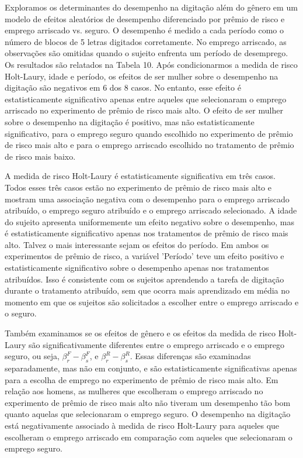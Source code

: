 \documentclass[a4paper,12pt]{article}[abntex2]
\begin{document}
Exploramos os determinantes do desempenho na digitação além do gênero em um modelo de efeitos aleatórios de desempenho diferenciado por prêmio de risco e emprego arriscado vs. seguro. O desempenho é medido a cada período como o número de blocos de 5 letras digitados corretamente. No emprego arriscado, as observações são omitidas quando o sujeito enfrenta um período de desemprego. Os resultados são relatados na Tabela 10. Após condicionarmos a medida de risco Holt-Laury, idade e período, os efeitos de ser mulher sobre o desempenho na digitação são negativos em 6 dos 8 casos. No entanto, esse efeito é estatisticamente significativo apenas entre aqueles que selecionaram o emprego arriscado no experimento de prêmio de risco mais alto. O efeito de ser mulher sobre o desempenho na digitação é positivo, mas não estatisticamente significativo, para o emprego seguro quando escolhido no experimento de prêmio de risco mais alto e para o emprego arriscado escolhido no tratamento de prêmio de risco mais baixo.

A medida de risco Holt-Laury é estatisticamente significativa em três casos. Todos esses três casos estão no experimento de prêmio de risco mais alto e mostram uma associação negativa com o desempenho para o emprego arriscado atribuído, o emprego seguro atribuído e o emprego arriscado selecionado. A idade do sujeito apresenta uniformemente um efeito negativo sobre o desempenho, mas é estatisticamente significativo apenas nos tratamentos de prêmio de risco mais alto. Talvez o mais interessante sejam os efeitos do período. Em ambos os experimentos de prêmio de risco, a variável 'Período' teve um efeito positivo e estatisticamente significativo sobre o desempenho apenas nos tratamentos atribuídos. Isso é consistente com os sujeitos aprendendo a tarefa de digitação durante o tratamento atribuído, sem que ocorra mais aprendizado em média no momento em que os sujeitos são solicitados a escolher entre o emprego arriscado e o seguro.

Também examinamos se os efeitos de gênero e os efeitos da medida de risco Holt-Laury são significativamente diferentes entre o emprego arriscado e o emprego seguro, ou seja, \(\beta_r^F - \beta_s^F\), e \(\beta_r^R - \beta_s^R\). Essas diferenças são examinadas separadamente, mas não em conjunto, e são estatisticamente significativas apenas para a escolha de emprego no experimento de prêmio de risco mais alto. Em relação aos homens, as mulheres que escolheram o emprego arriscado no experimento de prêmio de risco mais alto não tiveram um desempenho tão bom quanto aquelas que selecionaram o emprego seguro. O desempenho na digitação está negativamente associado à medida de risco Holt-Laury para aqueles que escolheram o emprego arriscado em comparação com aqueles que selecionaram o emprego seguro.
\end{document}
